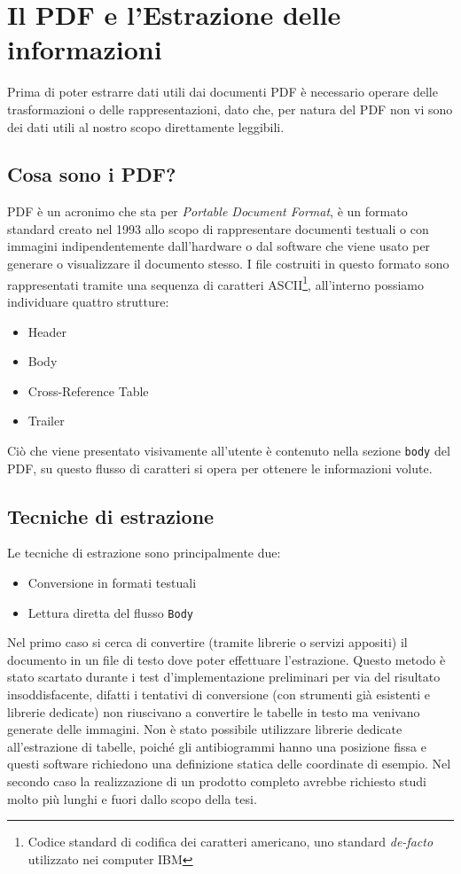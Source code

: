 \chapter{Il PDF e l'Estrazione delle informazioni}
Prima di poter estrarre dati utili dai documenti PDF è necessario operare delle trasformazioni o delle rappresentazioni, dato che, per natura del PDF non vi sono dei dati utili al nostro scopo direttamente leggibili.

\section{Cosa sono i PDF?}
PDF è un acronimo che sta per \textit{Portable Document Format}, è un formato standard creato nel 1993 allo scopo di rappresentare documenti testuali o con immagini indipendentemente dall'hardware o dal software che viene usato per generare o visualizzare il documento stesso. I file costruiti in questo formato sono rappresentati tramite una sequenza di caratteri ASCII\footnote{Codice standard di codifica dei caratteri americano, uno standard \textit{de-facto} utilizzato nei computer IBM}, all'interno possiamo individuare quattro strutture:

\begin{itemize}
	\item Header
	\item Body
	\item Cross-Reference Table
	\item Trailer
\end{itemize}
Ciò che viene presentato visivamente all'utente è contenuto nella sezione \texttt{body} del PDF, su questo flusso di caratteri si opera per ottenere le informazioni volute.
\newpage
\section{Tecniche di estrazione}
Le tecniche di estrazione sono principalmente due:
\begin{itemize}
	\item Conversione in formati testuali
	\item Lettura diretta del flusso \texttt{Body}
\end{itemize}

Nel primo caso si cerca di convertire (tramite librerie o servizi appositi) il documento in un file di testo dove poter effettuare l'estrazione. Questo metodo è stato scartato durante i test d'implementazione preliminari per via del risultato insoddisfacente, difatti i tentativi di conversione (con strumenti già esistenti e librerie dedicate) non riuscivano a convertire le tabelle in testo ma venivano generate delle immagini. 
Non è stato possibile utilizzare librerie dedicate all'estrazione di tabelle, poiché gli antibiogrammi hanno una posizione fissa e questi software richiedono una definizione statica delle coordinate di esempio.
Nel secondo caso la realizzazione di un prodotto completo avrebbe richiesto studi molto più lunghi e fuori dallo scopo della tesi.
